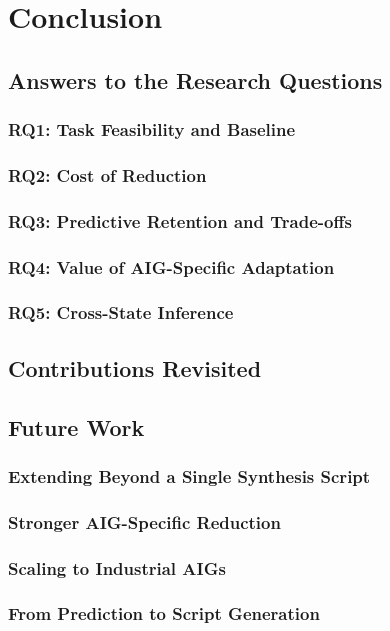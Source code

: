 \chapter{Conclusion}
\label{sec:conclusion}

\section{Answers to the Research Questions}
\label{sec:conclusion:answers}

\subsection{RQ1: Task Feasibility and Baseline}
\label{sec:conclusion:rq1}

\subsection{RQ2: Cost of Reduction}
\label{sec:conclusion:rq2}

\subsection{RQ3: Predictive Retention and Trade-offs}
\label{sec:conclusion:rq3}

\subsection{RQ4: Value of AIG-Specific Adaptation}
\label{sec:conclusion:rq4}

\subsection{RQ5: Cross-State Inference}
\label{sec:conclusion:rq5}

\section{Contributions Revisited}
\label{sec:conclusion:contributions}

\section{Future Work}
\label{sec:conclusion:futurework}

\subsection{Extending Beyond a Single Synthesis Script}
\label{sec:conclusion:futurework:algorithms}

\subsection{Stronger AIG-Specific Reduction}
\label{sec:conclusion:futurework:domain}

\subsection{Scaling to Industrial AIGs}
\label{sec:conclusion:futurework:scale}

\subsection{From Prediction to Script Generation}
\label{sec:conclusion:futurework:generation}
